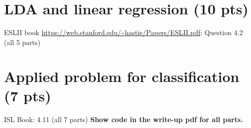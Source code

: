 \documentclass[11pt]{article}\usepackage[]{graphicx}\usepackage[]{color}
\begin{document}
\section{LDA and linear regression \small(10 pts)}
ESLII book \url{https://web.stanford.edu/~hastie/Papers/ESLII.pdf}: Question
4.2 (all 5 parts)

\section{Applied problem for classification \small(7 pts)} %
\label{sec:applied_problem_for_classification}
ISL Book: 4.11 (all 7 parts) \textbf{Show code in the write-up pdf for all
parts.}


\end{document}
